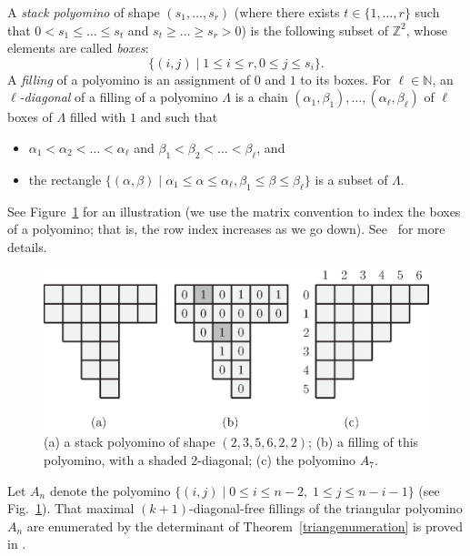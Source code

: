 \documentclass[12pt]{amsart}
\begin{document}
\begin{enumerate}[(i)]
A \emph{stack polyomino} of shape $(s_1,\ldots,s_r)$ (where there exists $t\in\{1,\ldots,r\}$ such that $0<s_1 \le \ldots\le s_t$ and $s_t\ge \ldots\ge s_r>0$) is the following subset of $\mathbb{Z}^2$, whose elements are called \emph{boxes}:
$$\{(i,j)\;|\; 1\le i\le r, 0\le j\le s_i\}.$$
A \emph{filling} of a polyomino is an assignment of $0$ and $1$ to its boxes.
For $\ell\in\mathbb{N}$, an \emph{$\ell$-diagonal} of a filling of a polyomino $\Lambda$ is a chain $(\alpha_1,\beta_1),\ldots,(\alpha_\ell,\beta_\ell)$ of $\ell$ boxes of $\Lambda$ filled with $1$ and such that
\begin{itemize}
\item $\alpha_1<\alpha_2<\ldots<\alpha_\ell$ and $\beta_1<\beta_2<\ldots<\beta_\ell$, and
\item the rectangle $\{(\alpha,\beta)\;|\; \alpha_1\le \alpha\le\alpha_\ell, \beta_1\le \beta\le\beta_\ell\}$ is a subset of $\Lambda$.
\end{itemize}
See Figure~\ref{polyominoes1} for an illustration (we use the matrix convention to index the boxes of a polyomino; that is, the row index increases as we go down). See~\cite{j-gtdfssp-05, k-gdidcffs-06, r-idsfmp-07} for more details.

\begin{figure}
\centerline{\includegraphics[scale=1]{polyominoes1.eps}}
\caption{\small{ (a) a stack polyomino of shape $(2,3,5,6,2,2)$; (b) a filling of this polyomino, with a shaded $2$-diagonal; (c) the polyomino $A_7$.}}\label{polyominoes1}
\end{figure}

Let $A_n$ denote the polyomino $\{(i,j)\;|\;0\le i\le n-2,\; 1\le j\le n-i-1\}$ (see Fig.~\ref{polyominoes1}). 
That maximal $(k+1)$-diagonal-free fillings of the triangular polyomino $A_n$ are enumerated by the determinant of Theorem~\ref{triangenumeration} is proved in \cite{ht-gbmdpi-92}.

\end{enumerate}
\end{document}
